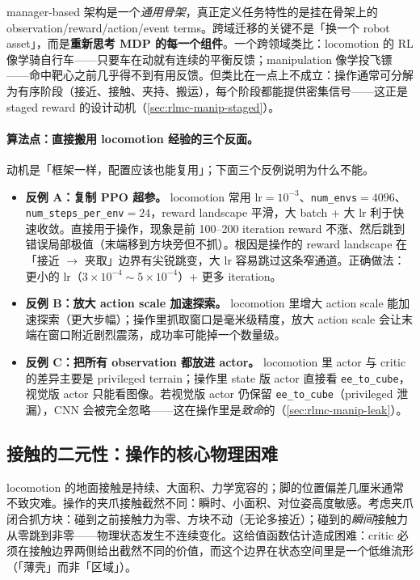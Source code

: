 \begin{insight}\label{ins:rlmc-manip-shared}
manager-based 架构是一个\emph{通用骨架}，真正定义任务特性的是挂在骨架上的 observation/reward/action/event terms。跨域迁移的关键不是「换一个 robot asset」，而是\textbf{重新思考 MDP 的每一个组件}。一个跨领域类比：locomotion 的 RL 像学骑自行车——只要车在动就有连续的平衡反馈；manipulation 像学投飞镖——命中靶心之前几乎得不到有用反馈。但类比在一点上不成立：操作通常可分解为有序阶段（接近、接触、夹持、搬运），每个阶段都能提供密集信号——这正是 staged reward 的设计动机（\cref{sec:rlmc-manip-staged}）。
\end{insight}

\paragraph{算法点：直接搬用 locomotion 经验的三个反面。}动机是「框架一样，配置应该也能复用」；下面三个反例说明为什么不能。
\begin{itemize}
  \item \textbf{反例 A：复制 PPO 超参。} locomotion 常用 lr$=10^{-3}$、\verb|num_envs|$=4096$、\verb|num_steps_per_env|$=24$，reward landscape 平滑，大 batch + 大 lr 利于快速收敛。直接用于操作，现象是前 100--200 iteration reward 不涨、然后跳到错误局部极值（末端移到方块旁但不抓）。根因是操作的 reward landscape 在「接近 $\to$ 夹取」边界有尖锐跳变，大 lr 容易跳过这条窄通道。正确做法：更小的 lr（$3\times10^{-4}\sim5\times10^{-4}$）+ 更多 iteration。
  \item \textbf{反例 B：放大 action scale 加速探索。} locomotion 里增大 action scale 能加速探索（更大步幅）；操作里抓取窗口是毫米级精度，放大 action scale 会让末端在窗口附近剧烈震荡，成功率可能掉一个数量级。
  \item \textbf{反例 C：把所有 observation 都放进 actor。} locomotion 里 actor 与 critic 的差异主要是 privileged terrain；操作里 state 版 actor 直接看 \verb|ee_to_cube|，视觉版 actor 只能看图像。若视觉版 actor 仍保留 \verb|ee_to_cube|（privileged 泄漏），CNN 会被完全忽略——这在操作里是\emph{致命}的（\cref{sec:rlmc-manip-leak}）。
\end{itemize}

\subsection{接触的二元性：操作的核心物理困难}
\label{sec:rlmc-manip-binary}

locomotion 的地面接触是持续、大面积、力学宽容的；脚的位置偏差几厘米通常不致灾难。操作的夹爪接触截然不同：瞬时、小面积、对位姿高度敏感。考虑夹爪闭合抓方块：碰到之前接触力为零、方块不动（无论多接近）；碰到的\emph{瞬间}接触力从零跳到非零——物理状态发生不连续变化。这给值函数估计造成困难：critic 必须在接触边界两侧给出截然不同的价值，而这个边界在状态空间里是一个低维流形（「薄壳」而非「区域」）。

